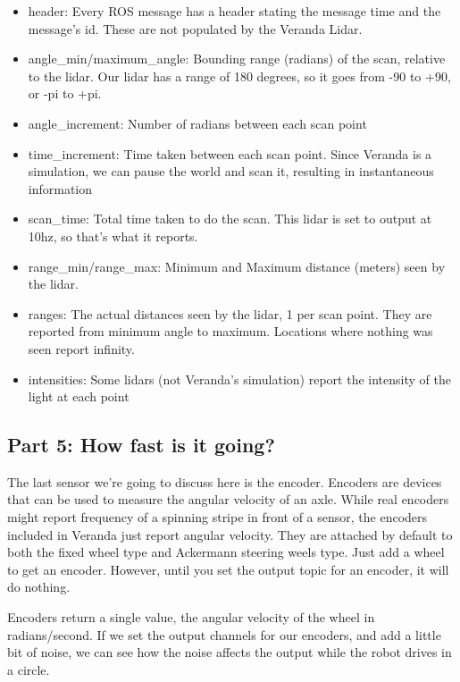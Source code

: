 \begin{itemize}
\tightlist
\item
  header: Every ROS message has a header stating the message time and
  the message's id. These are not populated by the Veranda Lidar.
\item
  angle\_min/maximum\_angle: Bounding range (radians) of the scan,
  relative to the lidar. Our lidar has a range of 180 degrees, so it
  goes from -90 to +90, or -pi to +pi.
\item
  angle\_increment: Number of radians between each scan point
\item
  time\_increment: Time taken between each scan point. Since Veranda is
  a simulation, we can pause the world and scan it, resulting in
  instantaneous information
\item
  scan\_time: Total time taken to do the scan. This lidar is set to
  output at 10hz, so that's what it reports.
\item
  range\_min/range\_max: Minimum and Maximum distance (meters) seen by
  the lidar.
\item
  ranges: The actual distances seen by the lidar, 1 per scan point. They
  are reported from minimum angle to maximum. Locations where nothing
  was seen report infinity.
\item
  intensities: Some lidars (not Veranda's simulation) report the
  intensity of the light at each point
\end{itemize}

\hypertarget{part-5-how-fast-is-it-going}{%
\subsection{Part 5: How fast is it
going?}\label{part-5-how-fast-is-it-going}}

The last sensor we're going to discuss here is the encoder. Encoders are
devices that can be used to measure the angular velocity of an axle.
While real encoders might report frequency of a spinning stripe in front
of a sensor, the encoders included in Veranda just report angular
velocity. They are attached by default to both the fixed wheel type and
Ackermann steering weels type. Just add a wheel to get an encoder.
However, until you set the output topic for an encoder, it will do
nothing.

Encoders return a single value, the angular velocity of the wheel in
radians/second. If we set the output channels for our encoders, and add
a little bit of noise, we can see how the noise affects the output while
the robot drives in a circle.

